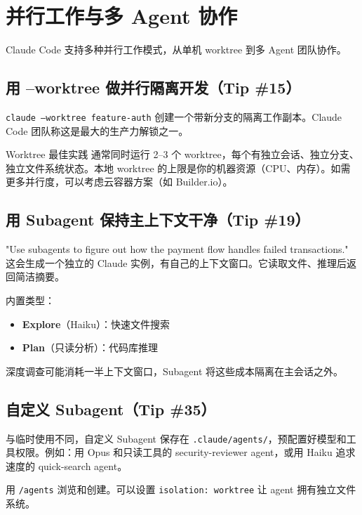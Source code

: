 \section{并行工作与多 Agent 协作}

Claude Code 支持多种并行工作模式，从单机 worktree 到多 Agent 团队协作。

\subsection{用 --worktree 做并行隔离开发（Tip \#15）}

\texttt{claude --worktree feature-auth} 创建一个带新分支的隔离工作副本。Claude Code 团队称这是最大的生产力解锁之一。

\begin{importantbox}{Worktree 最佳实践}
通常同时运行 2--3 个 worktree，每个有独立会话、独立分支、独立文件系统状态。本地 worktree 的上限是你的机器资源（CPU、内存）。如需更多并行度，可以考虑云容器方案（如 Builder.io）。
\end{importantbox}

\subsection{用 Subagent 保持主上下文干净（Tip \#19）}

"Use subagents to figure out how the payment flow handles failed transactions." 这会生成一个独立的 Claude 实例，有自己的上下文窗口。它读取文件、推理后返回简洁摘要。

内置类型：
\begin{itemize}
  \item \textbf{Explore}（Haiku）：快速文件搜索
  \item \textbf{Plan}（只读分析）：代码库推理
\end{itemize}

深度调查可能消耗一半上下文窗口，Subagent 将这些成本隔离在主会话之外。

\subsection{自定义 Subagent（Tip \#35）}

与临时使用不同，自定义 Subagent 保存在 \texttt{.claude/agents/}，预配置好模型和工具权限。例如：用 Opus 和只读工具的 security-reviewer agent，或用 Haiku 追求速度的 quick-search agent。

用 \texttt{/agents} 浏览和创建。可以设置 \texttt{isolation: worktree} 让 agent 拥有独立文件系统。

